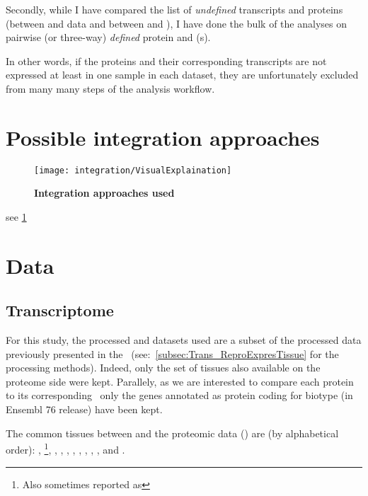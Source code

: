 Secondly, while I have compared the list of \emph{undefined} transcripts and
proteins (between  and  data and
between  and ), I have done the bulk of the
analyses on pairwise (or three-way) \emph{defined} protein and \mRNA(s).

In other words, if the proteins and their corresponding transcripts are not
expressed at least in one sample in each dataset, they are unfortunately excluded
from many many steps of the analysis workflow.

\section{Possible integration approaches}
\label{sec:IntegrationPossibleApproaches}

\begin{figure}[!htbp]
    \texttt{[image: integration/VisualExplaination]}\centering
    \caption[Integration approaches used]{\label{fig:visualexp}\textbf{Integration
    approaches used}
    }
\end{figure}
see \cref{fig:visualexp}

\section{Data}
\label{sec:IntegrationData}

\subsection{Transcriptome}
For this study, the processed  and  datasets
used are a subset of the processed data previously presented in
the~ (see:~\cref{subsec:Trans_ReproExpresTissue}
for the processing methods). Indeed, only the set of tissues also available
on the proteome side were kept. Parallely, as we are interested to compare each
protein to its corresponding \mRNA\, only the genes annotated as protein coding
for biotype (in Ensembl 76 release) have been kept.

The common tissues between  and the proteomic data
() are
(by alphabetical order):  , \footnote{Also
sometimes reported as },
, , ,
, , , , ,
 and .

